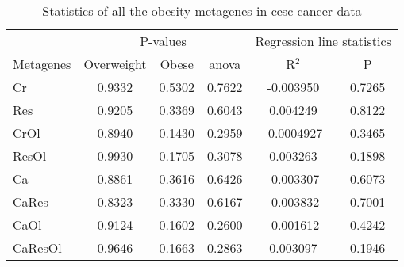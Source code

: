 \begin{appendices}
\begin{table}[htpb]
	\centering
	\caption{Statistics of all the obesity metagenes in \gls{cesc} cancer data}
	\label{tab:degmetacesc}
	\begin{threeparttable}
		\begin{tabular}{lccccc}
			& \multicolumn{3}{c}{ P-values} & \multicolumn{2}{c}{ Regression line statistics}\\
			\cmidrule(r){2-4} \cmidrule(r){5-6}
			Metagenes &  Overweight &  Obese &  \gls{anova} &  R$^2$ &  P \\
			\hline
			\hline
			\rule{0pt}{2.25ex}Cr      & 0.9332                      & 0.5302  & 0.7622             & -0.003950  & 0.7265              \\
            Res     & 0.9205                      & 0.3369  & 0.6043             & 0.004249   & 0.8122              \\
            CrOl    & 0.8940                      & 0.1430  & 0.2959             & -0.0004927 & 0.3465              \\
            ResOl   & 0.9930                      & 0.1705  & 0.3078             & 0.003263   & 0.1898              \\
            Ca      & 0.8861                      & 0.3616  & 0.6426             & -0.003307  & 0.6073              \\
            CaRes   & 0.8323                      & 0.3330  & 0.6167             & -0.003832  & 0.7001              \\
            CaOl    & 0.9124                      & 0.1602  & 0.2600             & -0.001612  & 0.4242              \\
            CaResOl & 0.9646                      & 0.1663  & 0.2863             & 0.003097   & 0.1946              \\
			\hline
			\hline
		\end{tabular}
	\end{threeparttable}
\end{table}


\end{appendices}
